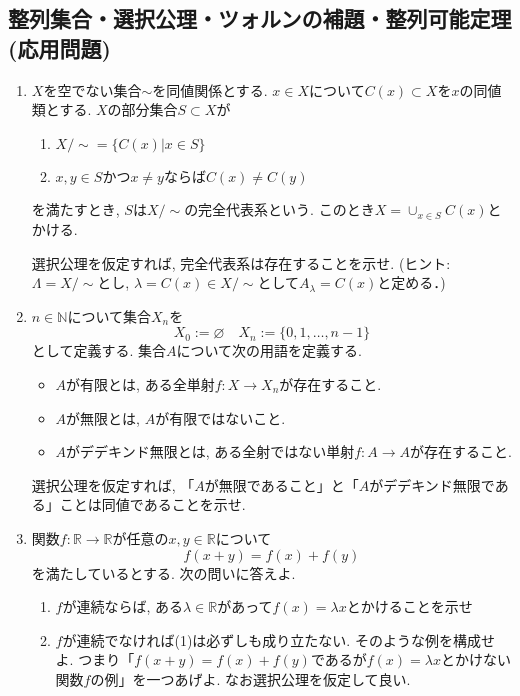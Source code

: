 \documentclass[dvipdfmx,a4paper,11pt]{article}
\newcommand{\R}{\mathbb{R}}
\newcommand{\N}{\mathbb{N}}
\theoremstyle{definition}
\begin{document}
 \newpage

 
 \begin{center}
\section{整列集合・選択公理・ツォルンの補題・整列可能定理(応用問題)}
\label{sec-9}
\end{center}

 \begin{enumerate}[label=\textbf{問}\ref*{sec-9}.\arabic*]
 
  \item  \label{5-complete-rep}$X$を空でない集合$\sim$を同値関係とする. $x \in X$について$C(x) \subset X$を$x$の同値類とする.
 $X$の部分集合$S \subset X$が
 \begin{enumerate}[label=(\arabic*).]
 \setlength{\parskip}{0cm}
  \setlength{\itemsep}{0pt}
  \item $X/\sim = \{ C(x) | x \in S\}$
  \item $x, y \in S$かつ$x \neq y$ならば$C(x) \neq C(y)$
  \end{enumerate}
を満たすとき, $S$は$X /\sim$の完全代表系という. 
このとき$X = \cup_{x \in S}C(x)$とかける. 
 
 選択公理を仮定すれば, 完全代表系は存在することを示せ. (ヒント: $\Lambda=X/\sim$とし, $\lambda=C(x) \in X/\sim$として$A_{\lambda}=C(x)$と定める．)

\item   $n \in \N$について集合$X_n$を
 $$
 X_0:=\varnothing 
 \quad
 X_{n}:=\{ 0,1,\ldots, n-1\}
 $$
 として定義する.
 集合$A$について次の用語を定義する. 
  \begin{itemize}
 \setlength{\parskip}{0cm}
  \setlength{\itemsep}{0pt}
\item $A$が有限とは, ある全単射$f : X \to X_n$が存在すること.
\item $A$が無限とは, $A$が有限ではないこと.
\item $A$がデデキンド無限とは, ある全射ではない単射$f : A \to A$が存在すること.
\end{itemize}
選択公理を仮定すれば, 「$A$が無限であること」と「$A$がデデキンド無限である」ことは同値であることを示せ. 

\item  関数$f : \R \to \R$が任意の$x,y \in \R$について
$$
f(x+y)=f(x) + f(y)
$$
を満たしているとする. 次の問いに答えよ. 
 \begin{enumerate}[label=(\arabic*).]
 \setlength{\parskip}{0cm}
  \setlength{\itemsep}{0pt}
  \item $f$が連続ならば, ある$\lambda \in \R$があって$f(x)=\lambda x$とかけることを示せ
  \item $f$が連続でなければ(1)は必ずしも成り立たない. そのような例を構成せよ. つまり「$f(x+y)=f(x) + f(y)$であるが$f(x) = \lambda x$とかけない関数$f$の例」を一つあげよ. なお選択公理を仮定して良い. 
  \end{enumerate}
  

\end{enumerate}
\end{document}
